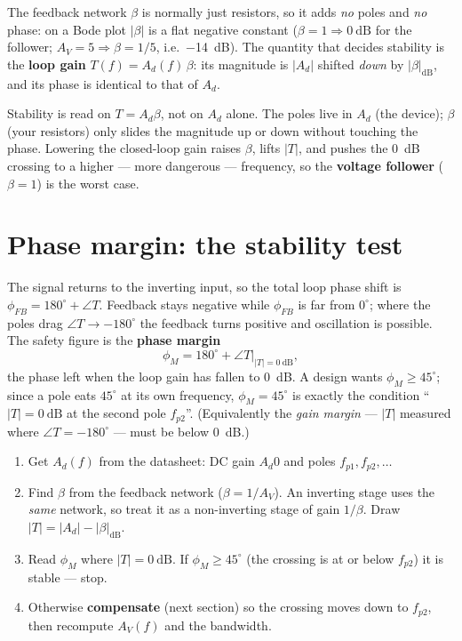 \documentclass[11pt,a4paper,oneside]{book}
\newcommand{\Ad}{A_d}
\begin{document}
The feedback network $\beta$ is normally just resistors, so it adds \emph{no}
poles and \emph{no} phase: on a Bode plot $|\beta|$ is a flat negative constant
($\beta=1\Rightarrow\qty{0}{\dB}$ for the follower; $A_V=5\Rightarrow\beta=1/5$,
i.e.\ \qty{-14}{\dB}). The quantity that decides stability is the \textbf{loop
gain} $T(f)=\Ad(f)\,\beta$: its magnitude is $|\Ad|$ shifted \emph{down} by
$|\beta|_{\mathrm{dB}}$, and its phase is identical to that of $\Ad$.

\begin{keyidea}
Stability is read on $T=\Ad\beta$, not on $\Ad$ alone. The poles live in $\Ad$
(the device); $\beta$ (your resistors) only slides the magnitude up or down
without touching the phase. Lowering the closed-loop gain raises $\beta$, lifts
$|T|$, and pushes the \qty{0}{\dB} crossing to a higher --- more dangerous ---
frequency, so the \textbf{voltage follower} ($\beta=1$) is the worst case.
\end{keyidea}

\section{Phase margin: the stability test}
The signal returns to the inverting input, so the total loop phase shift is
$\phi_{FB}=180^\circ+\angle T$. Feedback stays negative while $\phi_{FB}$ is far
from $0^\circ$; where the poles drag $\angle T\to-180^\circ$ the feedback turns
positive and oscillation is possible. The safety figure is the \textbf{phase
margin}
\[
  \phi_M=180^\circ+\angle T\big|_{|T|=\qty{0}{\dB}},
\]
the phase left when the loop gain has fallen to \qty{0}{\dB}. A design wants
$\phi_M\ge45^\circ$; since a pole eats $45^\circ$ at its own frequency,
$\phi_M=45^\circ$ is exactly the condition ``$|T|=\qty{0}{\dB}$ at the second pole
$f_{p2}$''. (Equivalently the \emph{gain margin} --- $|T|$ measured where
$\angle T=-180^\circ$ --- must be below \qty{0}{\dB}.)

\begin{protocol}
\begin{enumerate}[leftmargin=1.5cm]
  \item Get $\Ad(f)$ from the datasheet: DC gain $\Ad0$ and poles
        $f_{p1},f_{p2},\dots$
  \item Find $\beta$ from the feedback network ($\beta=1/A_V$). An inverting stage
        uses the \emph{same} network, so treat it as a non-inverting stage of gain
        $1/\beta$. Draw $|T|=|\Ad|-|\beta|_{\mathrm{dB}}$.
  \item Read $\phi_M$ where $|T|=\qty{0}{\dB}$. If $\phi_M\ge45^\circ$ (the
        crossing is at or below $f_{p2}$) it is stable --- stop.
  \item Otherwise \textbf{compensate} (next section) so the crossing moves down to
        $f_{p2}$, then recompute $A_V(f)$ and the bandwidth.
\end{enumerate}
\end{protocol}
\end{document}
